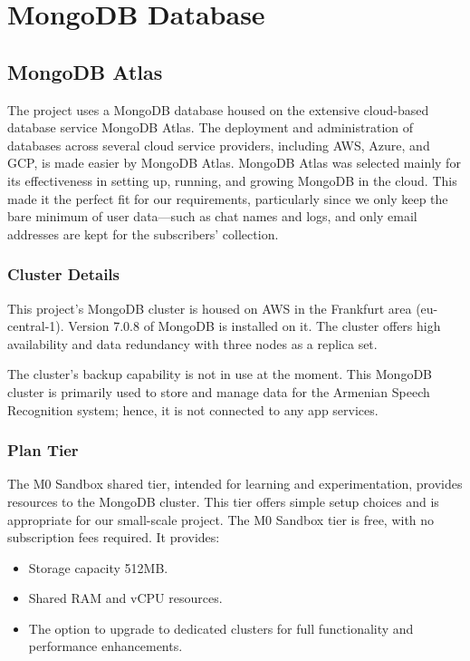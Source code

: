 \documentclass[conference]{IEEEtran}
\begin{document}
\section{MongoDB Database}

\subsection{MongoDB Atlas}

The project uses a MongoDB database housed on the extensive cloud-based database service MongoDB Atlas. The deployment and administration of databases across several cloud service providers, including AWS, Azure, and GCP, is made easier by MongoDB Atlas. MongoDB Atlas was selected mainly for its effectiveness in setting up, running, and growing MongoDB in the cloud. This made it the perfect fit for our requirements, particularly since we only keep the bare minimum of user data—such as chat names and logs, and only email addresses are kept for the subscribers' collection.

\subsubsection{Cluster Details}

This project's MongoDB cluster is housed on AWS in the Frankfurt area (eu-central-1). Version 7.0.8 of MongoDB is installed on it. The cluster offers high availability and data redundancy with three nodes as a replica set.

The cluster's backup capability is not in use at the moment. This MongoDB cluster is primarily used to store and manage data for the Armenian Speech Recognition system; hence, it is not connected to any app services.


\subsubsection{Plan Tier}

The M0 Sandbox shared tier, intended for learning and experimentation, provides resources to the MongoDB cluster. This tier offers simple setup choices and is appropriate for our small-scale project.
The M0 Sandbox tier is free, with no subscription fees required. It provides:
\begin{itemize}
    \item Storage capacity 512MB.
    \item Shared RAM and vCPU resources.
    \item The option to upgrade to dedicated clusters for full functionality and performance enhancements.
\end{itemize}
\end{document}
